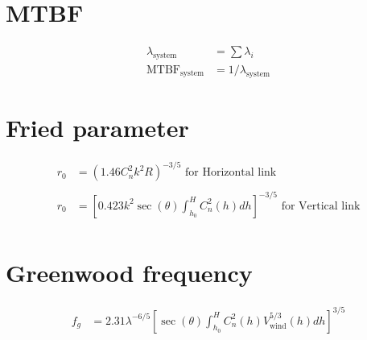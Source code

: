 \documentclass[a4paper]{article}
\begin{document}
\section{MTBF}
\begin{align*}
\lambda_\textrm{system} &= \sum \lambda_i \\
\textrm{MTBF}_\textrm{system} &= 1 / \lambda_\textrm{system}
\end{align*}

\section*{Fried parameter}
\begin{align*}
r_0 &= \left(1.46C_n^2k^2R\right)^{-3/5} \textrm{   for Horizontal link}\\
\\
r_0 &= \left[0.423k^2\sec(\theta)\int_{h_0}^H C_n^2(h)dh\right]^{-3/5} \textrm{   for Vertical link}\\
\end{align*}


\section*{Greenwood frequency}
\begin{align*}
f_g &= 2.31\lambda^{-6/5}\left[\sec(\theta)\int_{h_0}^H C_n^2(h)V_{\textrm{wind}}^{5/3}(h)dh\right]^{3/5}
\end{align*}
\end{document}
